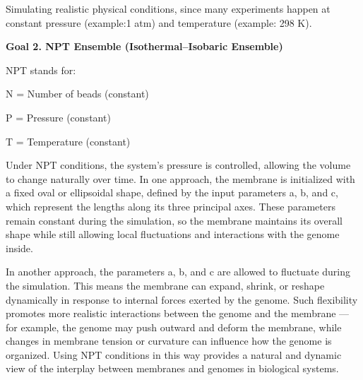 \documentclass[12pt]{article}
\begin{document}
\begin{flushleft}

Simulating realistic physical conditions, since many experiments happen at constant pressure (example:1 atm) and temperature  (example: 298 K).

  \noindent\textbf{Goal 2. NPT Ensemble (Isothermal–Isobaric Ensemble)}

NPT stands for:

    N = Number of beads (constant)

    P = Pressure (constant)

    T = Temperature (constant)
    
    Under NPT conditions, the system’s pressure is controlled, allowing the volume to change naturally over time. In one approach, the membrane is initialized with a fixed oval or ellipsoidal shape, defined by the input parameters a, b, and c, which represent the lengths along its three principal axes. These parameters remain constant during the simulation, so the membrane maintains its overall shape while still allowing local fluctuations and interactions with the genome inside.

In another approach, the parameters a, b, and c are allowed to fluctuate during the simulation. This means the membrane can expand, shrink, or reshape dynamically in response to internal forces exerted by the genome. Such flexibility promotes more realistic interactions between the genome and the membrane — for example, the genome may push outward and deform the membrane, while changes in membrane tension or curvature can influence how the genome is organized. Using NPT conditions in this way provides a natural and dynamic view of the interplay between membranes and genomes in biological systems.


\end{flushleft}
\end{document}
